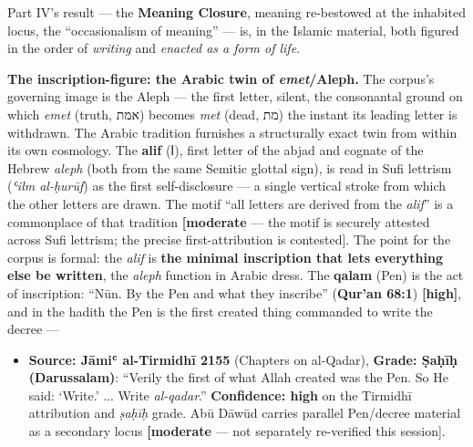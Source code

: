 \documentclass[11pt]{article}
\newcommand{\AR}[1]{{\arabicfont\beginR #1\endR}}
\newcommand{\HE}[1]{{\hebrewfont\beginR #1\endR}}
\begin{document}
Part IV's result — the \textbf{Meaning Closure}, meaning re-bestowed at the inhabited locus, the ``occasionalism of meaning'' — is, in the Islamic material, both figured in the order of \emph{writing} and \emph{enacted as a form of life}.

\textbf{The inscription-figure: the Arabic twin of \emph{emet}/\allowbreak{}Aleph.} The corpus's governing image is the Aleph — the first letter, silent, the consonantal ground on which \emph{emet} (truth, \HE{אמת}) becomes \emph{met} (dead, \HE{מת}) the instant its leading letter is withdrawn. The Arabic tradition furnishes a structurally exact twin from within its own cosmology. The \textbf{alif} (\AR{ا}), first letter of the abjad and cognate of the Hebrew \emph{aleph} (both from the same Semitic glottal sign), is read in Sufi lettrism (\emph{ʿilm al-ḥurūf}) as the first self-disclosure — a single vertical stroke from which the other letters are drawn. The motif ``all letters are derived from the \emph{alif}'' is a commonplace of that tradition \textbf{[moderate} — the motif is securely attested across Sufi lettrism; the precise first-attribution is contested]. The point for the corpus is formal: the \emph{alif} is \textbf{the minimal inscription that lets everything else be written}, the \emph{aleph} function in Arabic dress. The \textbf{qalam} (Pen) is the act of inscription: ``Nūn. By the Pen and what they inscribe'' (\textbf{Qur'an 68:1}) \textbf{[high]}, and in the hadith the Pen is the first created thing commanded to write the decree —

\begin{itemize}
\item \textbf{Source: Jāmiʿ al-Tirmidhī 2155} (Chapters on al-Qadar), \textbf{Grade: Ṣaḥīḥ (Darussalam)}: ``Verily the first of what Allah created was the Pen. So He said: `Write.' ... Write \emph{al-qadar}.'' \textbf{Confidence: high} on the Tirmidhī attribution and \emph{ṣaḥīḥ} grade. Abū Dāwūd carries parallel Pen/\allowbreak{}decree material as a secondary locus \textbf{[moderate} — not separately re-verified this session].
\end{itemize}
\end{document}
